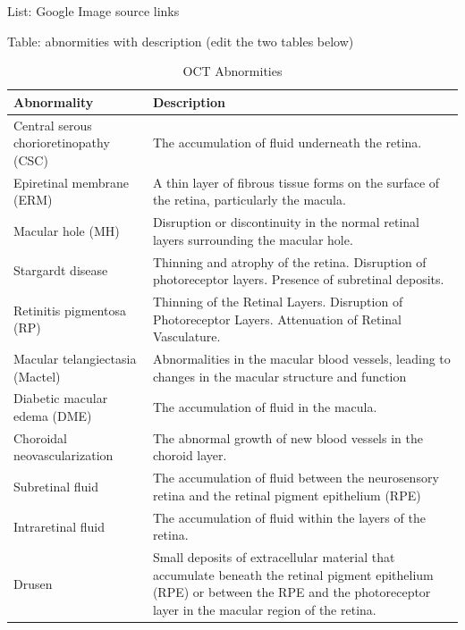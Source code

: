 \documentclass{article}
\begin{document}
	List: Google Image source links
	
	Table: abnormities with description (edit the two tables below)
	
	{
		\fontsize{9}{12}\selectfont
		\begin{longtable}{lp{3.8in}}
			\caption{OCT Abnormities}
			\label{tb:oct-abnormites}\\
			\toprule
			Abnormality&Description\\
			\midrule
			
			\multicolumn{1}{l}{Central serous chorioretinopathy (CSC)}
			& \multicolumn{1}{l}{The accumulation of fluid underneath the retina.}\\
			
			\multicolumn{1}{l}{Epiretinal membrane (ERM)}
			& A thin layer of fibrous tissue forms on the surface of the retina, particularly the macula.\\
			
			\multicolumn{1}{l}{Macular hole (MH)}
			& Disruption or discontinuity in the normal retinal layers surrounding the macular hole.\\
			
			\multicolumn{1}{l}{Stargardt disease}
			& Thinning and atrophy of the retina. Disruption of photoreceptor layers. Presence of subretinal deposits.\\
			
			\multicolumn{1}{l}{Retinitis pigmentosa (RP)}
			& Thinning of the Retinal Layers. Disruption of Photoreceptor Layers. Attenuation of Retinal Vasculature.\\
			
			\multicolumn{1}{l}{Macular telangiectasia (Mactel)}
			& Abnormalities in the macular blood vessels, leading to changes in the macular structure and function\\
			
			\multicolumn{1}{l}{Diabetic macular edema (DME)}
			& The accumulation of fluid in the macula. \\
			
			\multicolumn{1}{l}{Choroidal neovascularization}
			& The abnormal growth of new blood vessels in the choroid layer.\\
			
			\multicolumn{1}{l}{Subretinal fluid}
			&  The accumulation of fluid between the neurosensory retina and the retinal pigment epithelium (RPE)\\
			
			\multicolumn{1}{l}{Intraretinal fluid}
			& The accumulation of fluid within the layers of the retina.\\
			
			\multicolumn{1}{l}{Drusen}
			& Small deposits of extracellular material that accumulate beneath the retinal pigment epithelium (RPE) or between the RPE and the photoreceptor layer in the macular region of the retina.\\
			
			\bottomrule
		\end{longtable}
	}
	
\end{document}
